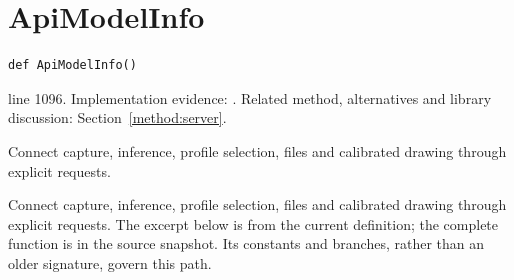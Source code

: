 \section{ApiModelInfo}\label{fn:web-server:ApiModelInfo}
\begin{lstlisting}[style=sig]
def ApiModelInfo()
\end{lstlisting}
 line 1096. Implementation evidence: \cite{code2026}. Related method, alternatives and library discussion: Section~\ref{method:server}.


Connect capture, inference, profile selection, files and calibrated drawing through explicit requests.


Connect capture, inference, profile selection, files and calibrated drawing through explicit requests. The excerpt below is from the current definition; the complete function is in the source snapshot. Its constants and branches, rather than an older signature, govern this path.


